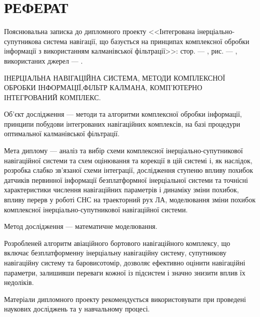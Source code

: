 % 
% 

\section*{РЕФЕРАТ}
Пояснювальна записка до дипломного проекту <<Інтегрована інерціально-супутникова система навігації, що базується на принципах комплексної обробки інформації
з використанням калманівської фільтрації>>: стор. ---   , рис. --- , використаних джерел --- .



ІНЕРЦІАЛЬНА НАВІГАЦІЙНА СИСТЕМА, МЕТОДИ КОМПЛЕКСНОЇ ОБРОБКИ ІНФОРМАЦІЇ,ФІЛЬТР КАЛМАНА, КОМП’ЮТЕРНО ІНТЕГРОВАНИЙ КОМПЛЕКС.

Об’єкт дослідження --- методи та алгоритми комплексної обробки інформації, принципи побудови інтегрованих навігаційних комплексів, на базі процедури
оптимальної калманівської фільтрації.

Мета диплому --- аналіз та вибір схеми комплексної інерціально-супутникової 
навігаційної системи та схем оцінювання та корекції в цій системі і, як наслідок, 
розробка слабко зв’язаної схеми інтеграції, дослідження ступеню 
впливу похибок датчиків первинної інформації  безплатформної інерціальної системи 
та точнісні характеристики числення навігаційних параметрів і динаміку зміни похибок, 
впливу перерв у роботі СНС на траекторний рух ЛА, моделювання зміни похибок 
комплексної інерціально-супутникової навігаційної системи.

Метод дослідження --- математичне моделювання.

Розробленей алгоритм авіаційного бортового навігаційного комплексу, що включає безплатформенну інерціальну навігаційну
систему, супутникову навігаційну систему та баровисотомір, дозволяє ефективно оцінити навігаційні параметри, залишивши
переваги кожної із підсистем і значно знизити вплив їх недоліків.

Матеріали дипломного проекту рекомендується використовувати при проведені наукових досліджень та 
у навчальному процесі.

%
